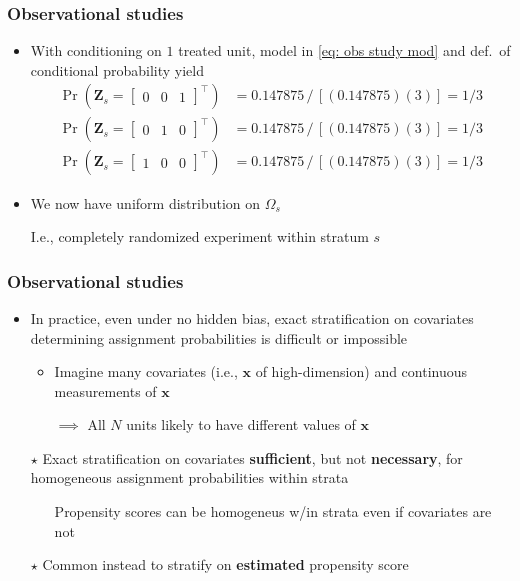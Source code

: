 \documentclass[table, xcolor = {dvipsnames}, 9pt]{beamer}
\theoremstyle{plain}
\begin{document}
\begin{frame}[t]
\frametitle{Observational studies}
\vfill
\begin{itemize} \vfill
\item With conditioning on $1$ treated unit, model in \eqref{eq: obs study mod} and def.~of conditional probability yield \vfill
\small
\begin{align*}
\Pr\left(\bm{Z}_s = \begin{bmatrix} 0 & 0 & 1 \end{bmatrix}^{\top}\right) & = 0.147875 \, / \, [(0.147875)(3)] = 1/3 \\
\Pr\left(\bm{Z}_s = \begin{bmatrix} 0 & 1 & 0 \end{bmatrix}^{\top}\right) & = 0.147875 \, / \, [(0.147875)(3)] = 1/3 \\
\Pr\left(\bm{Z}_s = \begin{bmatrix} 1 & 0 & 0 \end{bmatrix}^{\top}\right) & = 0.147875 \, / \, [(0.147875)(3)] = 1/3
\end{align*}
\normalsize \vfill
\item We now have uniform distribution on $\Omega_s$ \vfill 
\item[] I.e., completely randomized experiment within stratum $s$ \vfill
\end{itemize} \vfill
\end{frame}
\begin{frame}[t]
\frametitle{Observational studies}
\vfill
\begin{itemize} \vfill
\item In practice, even under no hidden bias, exact stratification on covariates determining assignment probabilities is difficult or impossible \vfill
\begin{itemize} \vfill
\item Imagine many covariates (i.e., $\bm{x}$ of high-dimension) and continuous measurements of $\bm{x}$ \vfill
\item[] $\implies$ All $N$ units likely to have different values of $\bm{x}$
\end{itemize} \vfill
\item[$\star$] Exact stratification on covariates \textbf{sufficient}, but not \textbf{necessary}, for homogeneous assignment probabilities within strata \vfill
\begin{itemize} \vfill 
\item[] Propensity scores can be homogeneus w/in strata even if covariates are not \vfill
\end{itemize} \vfill
\item[$\star$] Common instead to stratify on \textbf{estimated} propensity score \vfill
\end{itemize} \vfill
\end{frame}
\end{document}
